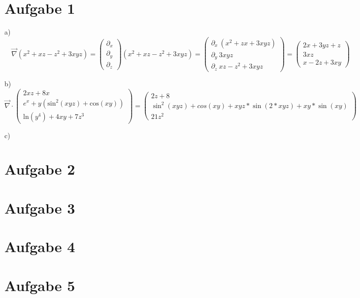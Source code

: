 \documentclass[a4paper]{article}
\newcommand{\nabvec}{\vec{\nabla}}
\newcommand{\delx}{\partial_x}
\newcommand{\dely}{\partial_y}
\newcommand{\delz}{\partial_z}
\begin{document}
\thispagestyle{fancy}

\section*{Aufgabe 1}
\mbox{}
\par{a)} $ \quad \nabvec(x^2 + xz - z^2 + 3xyz)= 
\begin{pmatrix}
	\delx \\
	\dely \\
	\delz 
\end{pmatrix}
(x^2 + xz - z^2 + 3xyz)
	= 
\begin{pmatrix}
	\delx \ (x^2 + zx + 3xyz) \\
	\dely \ 3xyz \\
	\delz \ xz - z^2 + 3xyz
\end{pmatrix}
	=
\begin{pmatrix}
	2x + 3yz + z \\
	3xz \\
	x - 2z + 3xy
\end{pmatrix}
	$
\vspace{0.5cm} \par{b)} 
$ \nabvec \cdot
\begin{pmatrix}
	2xz+8x \\ e^x + y(\text{sin}^2(xyz) + \text{cos}(xy)) \\ \text{ln}(y^4) + 4xy + 7z^3
\end{pmatrix}
=
\begin{pmatrix}
	2z + 8 \\
	\sin^2(xyz) + cos(xy) + xyz*\sin(2*xyz) + xy*\sin(xy) \\
	21 z^2
\end{pmatrix}
$
\vspace{0.5cm} \par{c)}
\section*{Aufgabe 2}
\section*{Aufgabe 3}
\section*{Aufgabe 4}
\section*{Aufgabe 5}
\end{document}
